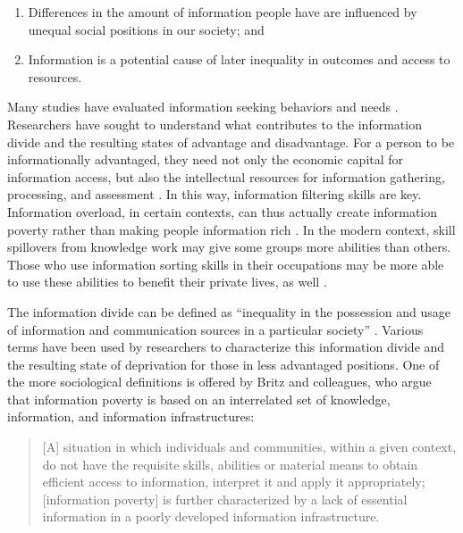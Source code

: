 \documentclass[11pt]{article}
\begin{document}
\begin{enumerate}
\def\labelenumi{(\arabic{enumi})}
\item
  Differences in the amount of information people have are influenced by
  unequal social positions in our society; and
\item
  Information is a potential cause of later inequality in outcomes and
  access to resources.
\end{enumerate}

Many studies have evaluated information seeking behaviors and needs
\citep{Case2016}. Researchers have sought to understand what contributes to the information divide
and the resulting states of advantage and disadvantage. For a person to be
informationally advantaged, they need not only the economic capital for
information access, but also the intellectual resources for information
gathering, processing, and assessment \citep{Sweetland1993}. In this way,
information filtering skills are key. Information overload, in certain contexts,
can thus actually create information poverty rather than making people
information rich \citep{Yu2006}. In the modern context, skill spillovers from
knowledge work may give some groups more abilities than others. Those who use
information sorting skills in their occupations may be more able to use these
abilities to benefit their private lives, as well \citep{Xanthopoulou2012}.

The information divide can be defined as ``inequality in the possession and usage of
information and communication sources in a particular society''
\citep{VanDijk1997,VanDijk2000}. Various terms have been used by researchers to characterize this information
divide and the resulting state of deprivation for those in less advantaged
positions. One of the more sociological definitions is offered by Britz and
colleagues, who argue that information poverty is based on an interrelated
set of knowledge, information, and information infrastructures:

\noindent\begin{minipage}{\linewidth}
\begin{quote}
  [A] situation in which individuals and communities, within a given context, do
  not have the requisite skills, abilities or material means to obtain efficient
  access to information, interpret it and apply it appropriately; [information poverty] is
  further characterized by a lack of essential information in a poorly developed
  information infrastructure. \citep[194]{Britz2004}
\end{quote}
\end{minipage} \\
\end{document}
